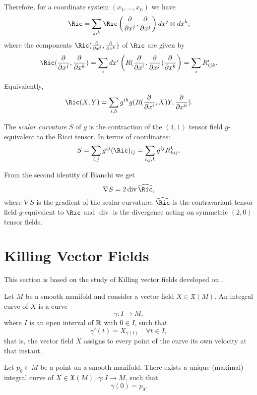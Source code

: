 Therefore, for a coordinate system $(x_1, \dots, x_n)$ we have
\[
	\Ric = \sum_{j,k} \Ric\left( \pd{}{x^j},\pd{}{x^j}  \right) dx^j \otimes dx^k,
\]
where the components $\Ric(\pd{}{x^j}, \pd{}{x^k})$ of $\Ric$ are given by
\[
	\Ric(\pd{}{x^j}, \pd{}{x^k}) = \sum_i dx^i \left( R(\pd{}{x^i}, \pd{}{x^j})\pd{}{x^k} \right) = \sum_i R^i_{ijk}.
\]

Equivalently,
\[
	\Ric(X,Y)  = \sum_{i,h} g^{ih} g(R(\pd{}{x^i}, X)Y, \pd{}{x^h}).
\]

\begin{definition}
	\label{def:scalarcurvature}
	The \emph{scalar curvature} $S$ of $g$ is the contraction of the $(1,1)$ tensor field $g$-equivalent to the Ricci tensor. In terms of coordinates:
	\[
		S = \sum_{i,j} g^{ij}(\Ric)_{ij} = \sum_{i,j,k} g^{ij} R^k_{kij}.
	\]
\end{definition}

From the second identity of Bianchi we get \cite[p. 88]{oneill83}
\[
	\nabla S = 2 \operatorname{div} \widehat{\Ric},
\]
where $\nabla S$ is the gradient of the scalar curvature, $\widehat{\Ric}$ is the contravariant tensor field $g$-equivalent to $\Ric$ and $\operatorname{div}$ is the divergence acting on symmetric $(2,0)$ tensor fields.

\section{Killing Vector Fields}

This section is based on the study of Killing vector fields developed on \cite[pp. 250-252]{oneill83}.

\begin{definition}
	Let $M$ be a smooth manifold and consider a vector field $X \in \mathfrak{X}(M)$.
	An integral curve of $X$ is a curve
	\[
		\gamma \colon I \to M,
	\]
	where $I$ is an open interval of $\mathbb{R}$ with $0 \in I$, such that
	\begin{equation}
		\label{eq:integralcurve}
		\gamma'(t) = X_{\gamma(t)} \quad \forall t \in I,
	\end{equation}
	that is, the vector field $X$ assigns to every point of the curve its own velocity at that instant.
\end{definition}

\begin{lemma}
	Let $p_0 \in M$ be a point on a smooth manifold. There exists a unique (maximal) integral curve of $X\in\mathfrak{X}(M)$, $\gamma \colon I \to M$, such that
	\begin{equation}
		\label{eq:initcond}
		\gamma(0) = p_0.
	\end{equation}
\end{lemma}


